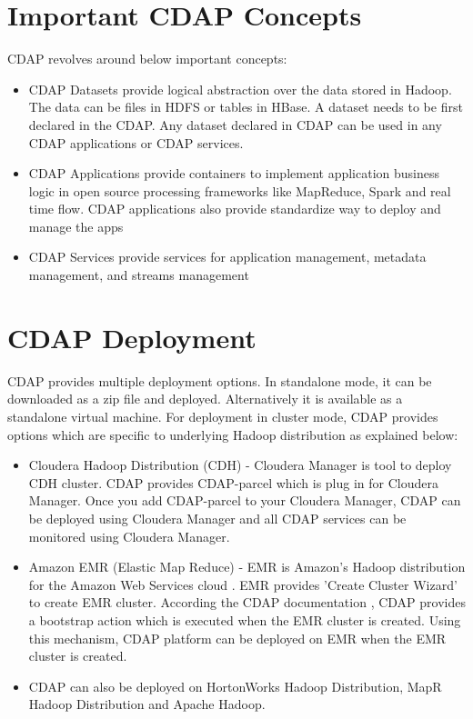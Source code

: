 \documentclass[9pt,twocolumn,twoside]{styles/osajnl}
\begin{document}
\section{Important CDAP Concepts}
CDAP revolves around below important concepts:
\begin{itemize}
\item CDAP Datasets provide logical abstraction over the data stored in
Hadoop. The data can be files in HDFS or tables in HBase. A dataset needs to
be first declared in the CDAP. Any dataset declared in CDAP can be used in
any CDAP applications or CDAP services.
\item CDAP Applications provide containers to implement application business
logic in open source processing frameworks like MapReduce, Spark and real
time flow. CDAP applications also provide standardize way to deploy and
manage the apps
\item CDAP Services provide services for application management, metadata
management, and streams management
\end{itemize}

\section{CDAP Deployment}
CDAP provides multiple deployment options. In standalone mode, it can be
downloaded as a zip file and deployed.
Alternatively it is available as a standalone virtual machine.
For deployment in cluster mode, CDAP provides options which are specific to
underlying Hadoop distribution as explained below:
\begin{itemize}
\item Cloudera Hadoop Distribution (CDH) - Cloudera Manager
\cite{www-cdh-manager} is tool to deploy CDH cluster. CDAP provides
CDAP-parcel \cite{www-cdap-cloudera-manager} which is plug in for
Cloudera Manager. Once you add CDAP-parcel to your Cloudera Manager, CDAP can
 be deployed using Cloudera Manager and all CDAP services can be monitored
 using Cloudera Manager.
\item Amazon EMR (Elastic Map Reduce) - EMR is Amazon's Hadoop distribution
for the Amazon Web Services cloud \cite{www-amazon-emr}.  EMR provides
'Create Cluster Wizard' to create EMR cluster. According the CDAP
documentation \cite{www-cdap-emr}, CDAP provides a bootstrap action which is
executed when the EMR cluster is created. Using this mechanism, CDAP platform
 can be deployed on EMR when the EMR cluster is created.
\item
CDAP can also be deployed on HortonWorks Hadoop Distribution, MapR Hadoop
Distribution and Apache Hadoop.
\end{itemize}
\end{document}
